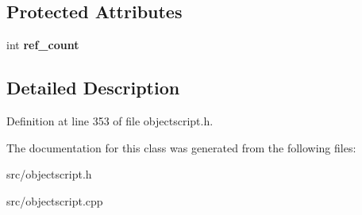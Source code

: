 \subsection*{Protected Attributes}
\begin{DoxyCompactItemize}
\item 
int {\bfseries ref\+\_\+count}\hypertarget{class_object_script_1_1_o_s_1_1_memory_manager_a90a4aa41fb955e5d2f44346f32b025c3}{}\label{class_object_script_1_1_o_s_1_1_memory_manager_a90a4aa41fb955e5d2f44346f32b025c3}

\end{DoxyCompactItemize}


\subsection{Detailed Description}


Definition at line 353 of file objectscript.\+h.



The documentation for this class was generated from the following files\+:\begin{DoxyCompactItemize}
\item 
src/objectscript.\+h\item 
src/objectscript.\+cpp\end{DoxyCompactItemize}
